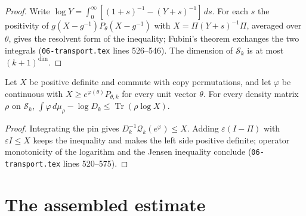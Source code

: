 \begin{proof}\leanok
    Write $\log Y=\int_0^\infty[(1+s)^{-1}-(Y+s)^{-1}]\,ds$. For each $s$ the
    positivity of $g(X-g^{-1})P_\theta(X-g^{-1})$ with
    $X=\Pi(Y+s)^{-1}\Pi$, averaged over $\theta$, gives the resolvent form of the
    inequality; Fubini's theorem exchanges the two integrals
    (\texttt{06-transport.tex} lines 526--546). The dimension of $\mathcal S_k$
    is at most $(k+1)^{\dim}$.
\end{proof}

\begin{lemma}\label{lem:replica_log_passage}
    \leanok
    Let $X$ be positive definite and commute with copy permutations, and let
    $\varphi$ be continuous with $X\ge e^{\varphi(\theta)}P_{\theta,k}$ for every
    unit vector $\theta$. For every density matrix $\rho$ on $\mathcal S_k$,
    $\int\varphi\,d\mu_\rho-\log D_k\le\operatorname{Tr}(\rho\log X)$.
\end{lemma}

\begin{proof}\leanok
    Integrating the pin gives $D_k^{-1}\mathcal Q_k(e^\varphi)\le X$. Adding
    $\varepsilon(I-\Pi)$ with $\varepsilon I\le X$ keeps the inequality and makes
    the left side positive definite; operator monotonicity of the logarithm and
    the Jensen inequality conclude (\texttt{06-transport.tex} lines 520--575).
\end{proof}

\section{The assembled estimate}

